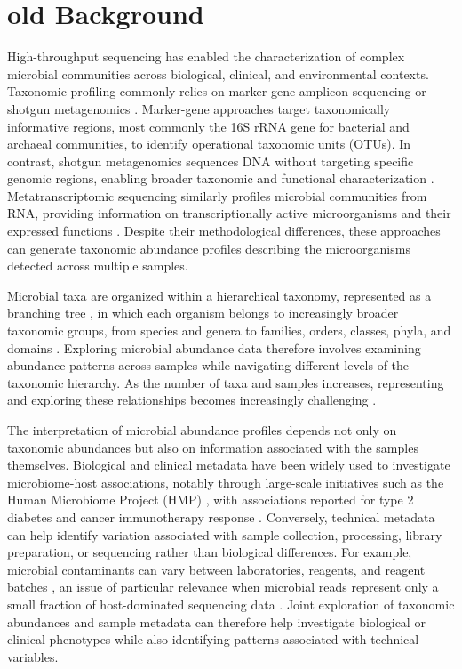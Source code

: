 \section{old Background}\label{sec1}

High-throughput sequencing has enabled the characterization of complex microbial communities across biological, clinical, and environmental contexts. Taxonomic profiling commonly relies on marker-gene amplicon sequencing or shotgun metagenomics \cite{jovel_characterization_2016,durazzi_comparison_2021}. Marker-gene approaches target taxonomically informative regions, most commonly the 16S rRNA gene for bacterial and archaeal communities, to identify operational taxonomic units (OTUs). In contrast, shotgun metagenomics sequences DNA without targeting specific genomic regions, enabling broader taxonomic and functional characterization \cite{jovel_characterization_2016,durazzi_comparison_2021,breitwieser_review_2019}. Metatranscriptomic sequencing similarly profiles microbial communities from RNA, providing information on transcriptionally active microorganisms and their expressed functions \cite{breitwieser_review_2019,bashiardes_use_2016}. Despite their methodological differences, these approaches can generate taxonomic abundance profiles describing the microorganisms detected across multiple samples.

Microbial taxa are organized within a hierarchical taxonomy, represented as a branching tree \cite{letunic_interactive_2021}, in which each organism belongs to increasingly broader taxonomic groups, from species and genera to families, orders, classes, phyla, and domains \cite{woese_towards_1990}. Exploring microbial abundance data therefore involves examining abundance patterns across samples while navigating different levels of the taxonomic hierarchy. As the number of taxa and samples increases, representing and exploring these relationships becomes increasingly challenging \cite{wagner_metaviz_2018}.


The interpretation of microbial abundance profiles depends not only on taxonomic abundances but also on information associated with the samples themselves. Biological and clinical metadata have been widely used to investigate microbiome-host associations, notably through large-scale initiatives such as the Human Microbiome Project (HMP) \cite{huttenhower_structure_2012,proctor_integrative_2019}, with associations reported for type 2 diabetes \citep{qin_metagenome-wide_2012} and cancer immunotherapy response \citep{routy_gut_2018,gopalakrishnan_gut_2018}. Conversely, technical metadata can help identify variation associated with sample collection, processing, library preparation, or sequencing rather than biological differences. For example, microbial contaminants can vary between laboratories, reagents, and reagent batches \cite{salter_reagent_2014,laurence_common_2014}, an issue of particular relevance when microbial reads represent only a small fraction of host-dominated sequencing data \cite{ge_comprehensive_2025}. Joint exploration of taxonomic abundances and sample metadata can therefore help investigate biological or clinical phenotypes while also identifying patterns associated with technical variables.





